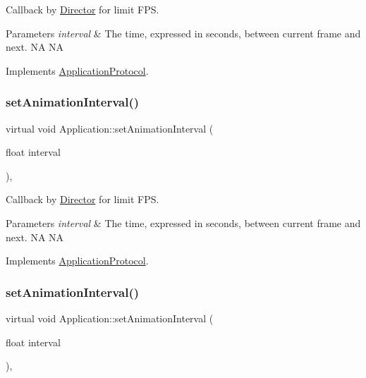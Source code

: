 Callback by \hyperlink{classDirector}{Director} for limit F\+PS. 


\begin{DoxyParams}{Parameters}
{\em interval} & The time, expressed in seconds, between current frame and next.  NA  NA \\
\hline
\end{DoxyParams}


Implements \hyperlink{classApplicationProtocol_ac69ac0f01aaba7cc8654ec7cce4eb88f}{Application\+Protocol}.

\mbox{\label{classApplication_af04c472d3fac0d922d088896504925ac}} 
\subsubsection{\texorpdfstring{set\+Animation\+Interval()}{setAnimationInterval()}\hspace{0.1cm}{\footnotesize\ttfamily [10/12]}}
{\footnotesize\ttfamily virtual void Application\+::set\+Animation\+Interval (\begin{DoxyParamCaption}\item[{float}]{interval }\end{DoxyParamCaption})\hspace{0.3cm}{\ttfamily [override]}, {\ttfamily [virtual]}}



Callback by \hyperlink{classDirector}{Director} for limit F\+PS. 


\begin{DoxyParams}{Parameters}
{\em interval} & The time, expressed in seconds, between current frame and next.  NA  NA \\
\hline
\end{DoxyParams}


Implements \hyperlink{classApplicationProtocol_ac69ac0f01aaba7cc8654ec7cce4eb88f}{Application\+Protocol}.

\mbox{\label{classApplication_af04c472d3fac0d922d088896504925ac}} 
\subsubsection{\texorpdfstring{set\+Animation\+Interval()}{setAnimationInterval()}\hspace{0.1cm}{\footnotesize\ttfamily [11/12]}}
{\footnotesize\ttfamily virtual void Application\+::set\+Animation\+Interval (\begin{DoxyParamCaption}\item[{float}]{interval }\end{DoxyParamCaption})\hspace{0.3cm}{\ttfamily [override]}, {\ttfamily [virtual]}}



